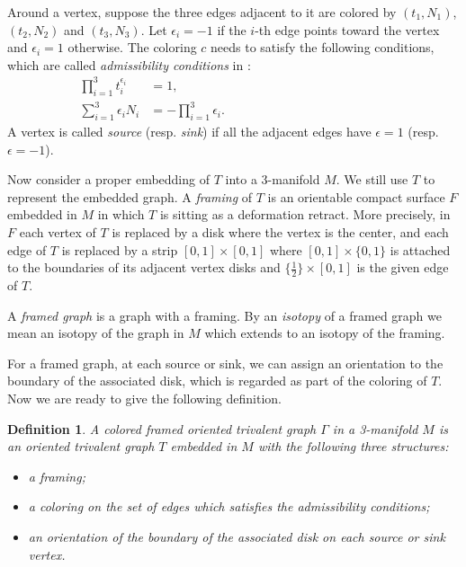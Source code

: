 \documentclass[12pt]{amsart}
\newtheorem{defn}[theo]{Definition}
\begin{document}
Around a vertex, suppose the three edges adjacent to it are colored by $(t_1, N_1)$, $(t_2, N_2)$ and $(t_3, N_3)$. Let $\epsilon_i=-1$ if the $i$-th edge points toward the vertex and $\epsilon_i=1$ otherwise. The coloring $c$ needs to satisfy the following conditions, which are called {\it admissibility conditions} in \cite{MR2255851}:
\begin{align}
\prod_{i=1}^{3} t_{i}^{\epsilon_i}&=1,\hspace{7cm} \label{multi}\\
\sum_{i=1}^{3} \epsilon_i N_i&=-\prod_{i=1}^{3} \epsilon_i.
\end{align}
A vertex is called {\it source} (resp. {\it sink}) if all the adjacent edges have $\epsilon=1$ (resp. $\epsilon=-1$). 


Now consider a proper embedding of $T$ into a 3-manifold $M$. We still use $T$ to represent the embedded graph. A {\it framing} of $T$ is an orientable compact surface $F$ embedded in $M$ in which $T$ is sitting as a deformation retract. More precisely, in $F$ each vertex of $T$ is replaced by a disk where the vertex is the center, and each edge of $T$ is replaced by a strip $[0, 1]\times [0, 1]$ where $[0, 1]\times \{0, 1\}$ is attached to the boundaries of its adjacent vertex disks and $\{\frac{1}{2}\}\times [0, 1]$ is the given edge of $T$. %

A {\it framed graph} is a graph with a framing. By an {\it isotopy} of a framed graph we mean an isotopy of the graph in $M$ which extends to an isotopy of the framing. 

For a framed graph, at each source or sink, we can assign an orientation to the boundary of the associated disk, which is regarded as part of the coloring of $T$. Now we are ready to give the following definition.

\begin{defn}
\rm
A {\it colored framed oriented trivalent graph} $\Gamma$ in a 3-manifold $M$ is an oriented trivalent graph $T$ embedded in $M$ with the following three structures:
\begin{itemize}
\item a framing;
\item a coloring on the set of edges which satisfies the admissibility conditions;
\item an orientation of the boundary of the associated disk on each source or sink vertex.
\end{itemize}
\end{defn}
\end{document}
